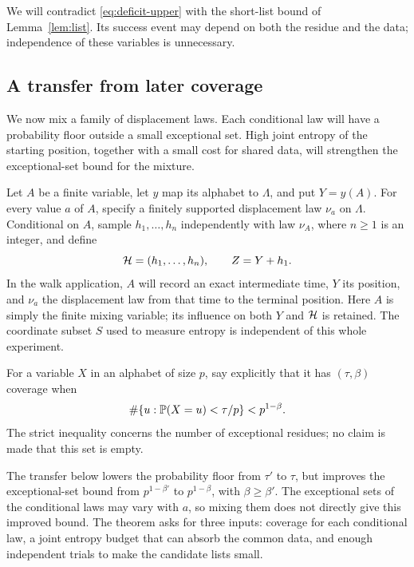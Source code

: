 We will contradict \eqref{eq:deficit-upper} with the short-list bound
of Lemma~\ref{lem:list}. Its success event may depend on both the residue
and the data; independence of these variables is unnecessary.

\subsection{A transfer from later coverage}
We now mix a family of displacement laws. Each conditional law will
have a probability floor outside a small exceptional set. High joint
entropy of the starting position, together with a small cost for shared
data, will strengthen the exceptional-set bound for the mixture.

Let $A$ be a finite variable, let $y$ map its alphabet to $\Lambda$,
and put $Y=y(A)$. For every value $a$ of $A$, specify a finitely
supported displacement law $\nu_a$ on $\Lambda$. Conditional on $A$,
sample $h_1,\ldots,h_n$ independently with law $\nu_A$, where $n\ge1$
is an integer, and define
\[
 \mathcal H=(h_1,\ldots,h_n),\qquad Z=Y+h_1.
\]
In the walk application, $A$ will record an exact intermediate time,
$Y$ its position, and $\nu_a$ the displacement law from that time to
the terminal position. Here $A$ is simply the finite mixing variable;
its influence on both $Y$ and $\mathcal H$ is retained. The coordinate
subset $S$ used to measure entropy is independent of this whole experiment.

For a variable $X$ in an alphabet of size $p$, say explicitly that it
has $(\tau,\beta)$ coverage when
\begin{equation}\label{eq:coverage-definition}
 \#\{u:\mathbb P(X=u)<\tau/p\}<p^{1-\beta}.
\end{equation}
The strict inequality concerns the number of exceptional residues;
no claim is made that this set is empty.

The transfer below lowers the probability floor from $\tau'$ to $\tau$,
but improves the exceptional-set bound from $p^{1-\beta'}$ to
$p^{1-\beta}$, with $\beta\ge\beta'$. The exceptional sets of the
conditional laws may vary with $a$, so mixing them does not directly
give this improved bound. The theorem asks for three inputs: coverage
for each conditional law, a joint entropy budget that
can absorb the common data, and enough independent trials to make the
candidate lists small.

